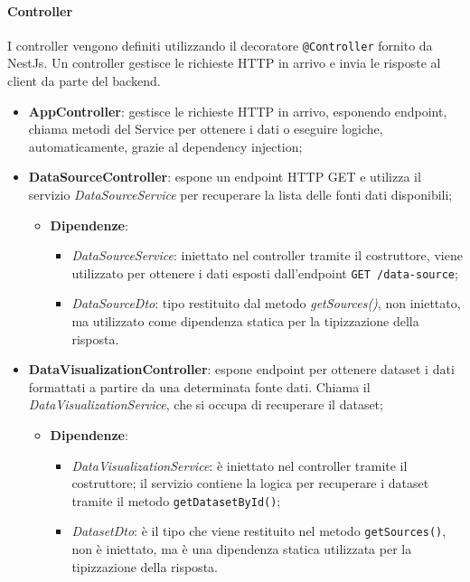 \paragraph{Controller}
I controller vengono definiti utilizzando il decoratore \texttt{@Controller} fornito da NestJs.
Un controller gestisce le richieste HTTP in arrivo e invia le risposte al client da parte del backend.
\begin{itemize}
    \item \textbf{AppController}: gestisce le richieste HTTP in arrivo, esponendo endpoint, chiama metodi del Service per ottenere i dati o eseguire logiche, automaticamente, grazie al dependency injection;
    \item \textbf{DataSourceController}: espone un endpoint HTTP GET e utilizza il servizio \textit{DataSourceService} per recuperare la lista delle fonti dati disponibili;
    \begin{itemize}
        \item \textbf{Dipendenze}:
        \begin{itemize}
            \item \textit{DataSourceService}: iniettato nel controller tramite il costruttore, viene utilizzato per ottenere i dati esposti dall'endpoint \texttt{GET /data-source};
            \item \textit{DataSourceDto}: tipo restituito dal metodo \textit{getSources()}, non iniettato, ma utilizzato come dipendenza statica per la tipizzazione della risposta.
        \end{itemize}
    \end{itemize}
    \item \textbf{DataVisualizationController}: espone endpoint per ottenere dataset i dati formattati a partire da una determinata fonte dati. Chiama il \textit{DataVisualizationService}, che si occupa di recuperare il dataset;
    \begin{itemize}
        \item \textbf{Dipendenze}:
        \begin{itemize}
            \item \textit{DataVisualizationService}: è iniettato nel controller tramite il costruttore; il servizio contiene la logica per recuperare i dataset tramite il metodo \texttt{getDatasetById()};
            \item \textit{DatasetDto}: è il tipo che viene restituito nel metodo \texttt{getSources()}, non è iniettato, ma è una dipendenza statica utilizzata per la tipizzazione della risposta.
        \end{itemize}
    \end{itemize}
\end{itemize}


